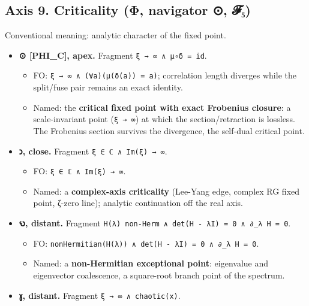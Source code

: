\documentclass[12pt,a4paper]{article}
\begin{document}
\hypertarget{axis-9.-criticality-ux3c6-navigator-ux1d4d5ux2085}{%
\subsection{Axis 9. Criticality (Φ, navigator ⊙,
𝓕₅)}\label{axis-9.-criticality-ux3c6-navigator-ux1d4d5ux2085}}

Conventional meaning: analytic character of the fixed point.

\begin{itemize}
\tightlist
\item
  \textbf{⊙ {[}PHI\_C{]}, apex.} Fragment
  \texttt{ξ\ →\ ∞\ ∧\ μ∘δ\ =\ id}.

  \begin{itemize}
  \tightlist
  \item
    FO: \texttt{ξ\ →\ ∞\ ∧\ (∀a)(μ(δ(a))\ =\ a)}; correlation length
    diverges while the split/fuse pair remains an exact identity.
  \item
    Named: the \textbf{critical fixed point with exact Frobenius
    closure}: a scale-invariant point (\texttt{ξ\ →\ ∞}) at which the
    section/retraction is lossless. The Frobenius section survives the
    divergence, the self-dual critical point.
  \end{itemize}
\item
  \textbf{𐑮, close.} Fragment \texttt{ξ\ ∈\ ℂ\ ∧\ Im(ξ)\ →\ ∞}.

  \begin{itemize}
  \tightlist
  \item
    FO: \texttt{ξ\ ∈\ ℂ\ ∧\ Im(ξ)\ →\ ∞}.
  \item
    Named: a \textbf{complex-axis criticality} (Lee-Yang edge, complex
    RG fixed point, ζ-zero line); analytic continuation off the real
    axis.
  \end{itemize}
\item
  \textbf{𐑻, distant.} Fragment
  \texttt{H(λ)\ non-Herm\ ∧\ det(H\ -\ λI)\ =\ 0\ ∧\ ∂\_λ\ H\ =\ 0}.

  \begin{itemize}
  \tightlist
  \item
    FO:
    \texttt{nonHermitian(H(λ))\ ∧\ det(H\ -\ λI)\ =\ 0\ ∧\ ∂\_λ\ H\ =\ 0}.
  \item
    Named: a \textbf{non-Hermitian exceptional point}: eigenvalue and
    eigenvector coalescence, a square-root branch point of the spectrum.
  \end{itemize}
\item
  \textbf{𐑣, distant.} Fragment \texttt{ξ\ →\ ∞\ ∧\ chaotic(x)}.


\end{itemize}
\end{document}

